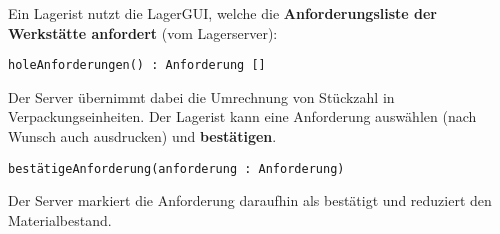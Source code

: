 Ein Lagerist nutzt die LagerGUI, welche die \textbf{Anforderungsliste der Werkstätte anfordert} (vom Lagerserver):

\texttt{holeAnforderungen() : Anforderung []}

Der Server übernimmt dabei die Umrechnung von Stückzahl in Verpackungseinheiten.
Der Lagerist kann eine Anforderung auswählen (nach Wunsch auch ausdrucken) und \textbf{bestätigen}.

\texttt{bestätigeAnforderung(anforderung : Anforderung)}

Der Server markiert die Anforderung daraufhin als bestätigt und reduziert den Materialbestand.